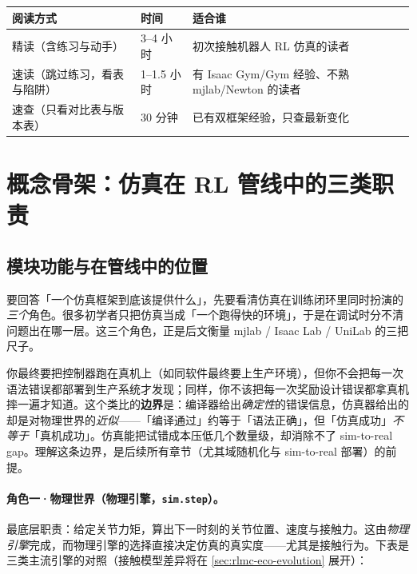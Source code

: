 \begin{center}
\small
\begin{tabular}{@{}lll@{}}
\toprule
阅读方式 & 时间 & 适合谁 \\
\midrule
精读（含练习与动手） & 3--4 小时 & 初次接触机器人 RL 仿真的读者 \\
速读（跳过练习，看表与陷阱） & 1--1.5 小时 & 有 Isaac Gym/Gym 经验、不熟 mjlab/Newton 的读者 \\
速查（只看对比表与版本表） & 30 分钟 & 已有双框架经验，只查最新变化 \\
\bottomrule
\end{tabular}
\end{center}

\section{概念骨架：仿真在 RL 管线中的三类职责}
\label{sec:rlmc-eco-roles}

\subsection{模块功能与在管线中的位置}

要回答「一个仿真框架到底该提供什么」，先要看清仿真在训练闭环里同时扮演的\emph{三个}角色。很多初学者只把仿真当成「一个跑得快的环境」，于是在调试时分不清问题出在哪一层。这三个角色，正是后文衡量 mjlab / Isaac Lab / UniLab 的三把尺子。

\begin{insight}\label{ins:rlmc-eco-analogy}
你最终要把控制器跑在真机上（如同软件最终要上生产环境），但你不会把每一次语法错误都部署到生产系统才发现；同样，你不该把每一次奖励设计错误都拿真机摔一遍才知道。这个类比的\textbf{边界}是：编译器给出\emph{确定性}的错误信息，仿真器给出的却是对物理世界的\emph{近似}——「编译通过」约等于「语法正确」，但「仿真成功」\emph{不等于}「真机成功」。仿真能把试错成本压低几个数量级，却消除不了 sim-to-real gap。理解这条边界，是后续所有章节（尤其域随机化与 sim-to-real 部署）的前提。
\end{insight}

\paragraph{角色一·物理世界（物理引擎，\texttt{sim.step}）。}最底层职责：给定关节力矩，算出下一时刻的关节位置、速度与接触力。这由\emph{物理引擎}完成，而物理引擎的选择直接决定仿真的真实度——尤其是接触行为。下表是三类主流引擎的对照（接触模型差异将在 \cref{sec:rlmc-eco-evolution} 展开）：

